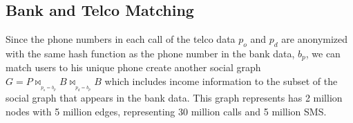 \subsection{Bank and Telco Matching}

Since the phone numbers in each call of the telco data $ p_o $ and $ p_d $ are anonymized with the same hash function as the phone number in the bank data, $ b_p $, we can match users to his unique phone create another social graph $ G = P \bowtie_{_{p_o = b_p}} B \bowtie_{_{p_d = b_p}} B $ which includes income information to the subset of the social graph that appears in the bank data. This graph represents has 2 million nodes with 5 million edges, representing 30 million calls and 5 million SMS.

